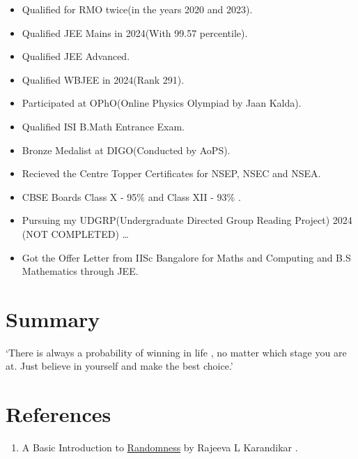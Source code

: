 \documentclass[
  letterpaper,
  DIV=11,
  numbers=noendperiod]{scrreprt}
\providecommand{\tightlist}{%
  \setlength{\itemsep}{0pt}\setlength{\parskip}{0pt}}\usepackage{longtable,booktabs,array}
\newlength{\cslhangindent}
\newenvironment{CSLReferences}[2] %
 {\begin{list}{}{%
  \setlength{\itemindent}{0pt}
  \setlength{\leftmargin}{0pt}
  \setlength{\parsep}{0pt}
  \ifodd #1
   \setlength{\leftmargin}{\cslhangindent}
   \setlength{\itemindent}{-1\cslhangindent}
  \fi
  \setlength{\itemsep}{#2\baselineskip}}}
 {\end{list}}
\begin{document}
\begin{tcolorbox}
\begin{tcolorbox}
\begin{tcolorbox}[enhanced jigsaw, toprule=.15mm, colframe=quarto-callout-note-color-frame, breakable, bottomrule=.15mm, rightrule=.15mm, opacityback=0, left=2mm, leftrule=.75mm, colback=white, arc=.35mm]
\begin{itemize}
\tightlist
\item
  Qualified for RMO twice(in the years 2020 and 2023).
\item
  Qualified JEE Mains in 2024(With 99.57 percentile).
\item
  Qualified JEE Advanced.
\item
  Qualified WBJEE in 2024(Rank 291).
\item
  Participated at OPhO(Online Physics Olympiad by Jaan Kalda).
\item
  Qualified ISI B.Math Entrance Exam.
\item
  Bronze Medalist at DIGO(Conducted by AoPS).
\item
  Recieved the Centre Topper Certificates for NSEP, NSEC and NSEA.
\item
  CBSE Boards Class X - 95\% and Class XII - 93\% .
\item
  Pursuing my UDGRP(Undergraduate Directed Group Reading Project) 2024
  (NOT COMPLETED) \ldots{}
\item
  Got the Offer Letter from IISc Bangalore for Maths and Computing and
  B.S Mathematics through JEE.
\end{itemize}

\end{tcolorbox}


\chapter{Summary}\label{summary}

`There is always a probability of winning in life , no matter which
stage you are at. Just believe in yourself and make the best choice.'


\chapter*{References}\label{references}


\begin{enumerate}
\def\labelenumi{\arabic{enumi}.}
\tightlist
\item
  A Basic Introduction to
  \href{https://www.ias.ac.in/article/fulltext/reso/001/02/0055-0068}{Randomness}
  by Rajeeva L Karandikar .
\end{enumerate}

\label{refs}
\begin{CSLReferences}{0}{1}
\end{CSLReferences}

\end{tcolorbox}

\end{tcolorbox}
\end{document}
